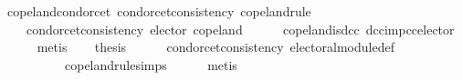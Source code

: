 \begin{isabellebody}
\isanewline
\isanewline
{}\isamarkupfalse%
\ copeland{\isacharunderscore}{\kern0pt}condorcet{\isacharcolon}{\kern0pt}\ {\isachardoublequoteopen}condorcet{\isacharunderscore}{\kern0pt}consistency\ copeland{\isacharunderscore}{\kern0pt}rule{\isachardoublequoteclose}\isanewline
%
\isadelimproof
%
\endisadelimproof
%
\isatagproof
{}\isamarkupfalse%
\ {\isacharminus}{\kern0pt}\isanewline
\ \ \isamarkupfalse%
\isanewline
\ \ \ \ {\isachardoublequoteopen}condorcet{\isacharunderscore}{\kern0pt}consistency\ {\isacharparenleft}{\kern0pt}elector\ copeland{\isacharparenright}{\kern0pt}{\isachardoublequoteclose}\isanewline
\ \ \ \ \isamarkupfalse%
\ copeland{\isacharunderscore}{\kern0pt}is{\isacharunderscore}{\kern0pt}dcc\ dcc{\isacharunderscore}{\kern0pt}imp{\isacharunderscore}{\kern0pt}cc{\isacharunderscore}{\kern0pt}elector\isanewline
\ \ \ \ \isamarkupfalse%
\ metis\isanewline
\ \ \isamarkupfalse%
\ {\isacharquery}{\kern0pt}thesis\isanewline
\ \ \ \ \isamarkupfalse%
\ condorcet{\isacharunderscore}{\kern0pt}consistency{}\ electoral{\isacharunderscore}{\kern0pt}module{\isacharunderscore}{\kern0pt}def\isanewline
\ \ \ \ \ \ \ \ \ \ copeland{\isacharunderscore}{\kern0pt}rule{\isachardot}{\kern0pt}simps\isanewline
\ \ \ \ \isamarkupfalse%
\ metis\isanewline
{}\isamarkupfalse%
%
\endisatagproof
{\isafoldproof}%
%
\isadelimproof
\isanewline
%
\endisadelimproof
%
\isadelimtheory
\isanewline
%
\endisadelimtheory
%
\isatagtheory
{}\isamarkupfalse%
%
\endisatagtheory
{\isafoldtheory}%
%
\isadelimtheory
%
\endisadelimtheory
%
\end{isabellebody}%
\endinput
